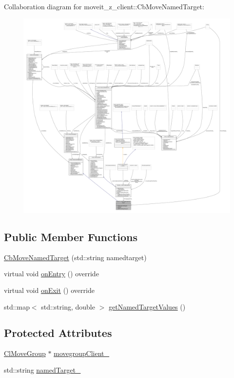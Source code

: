 Collaboration diagram for moveit\+\_\+z\+\_\+client\+:\+:Cb\+Move\+Named\+Target\+:
\nopagebreak
\begin{figure}[H]
\begin{center}
\leavevmode
\includegraphics[width=350pt]{classmoveit__z__client_1_1CbMoveNamedTarget__coll__graph}
\end{center}
\end{figure}
\subsection*{Public Member Functions}
\begin{DoxyCompactItemize}
\item 
\hyperlink{classmoveit__z__client_1_1CbMoveNamedTarget_a4cd1851e18426af84f5b77724d422d4c}{Cb\+Move\+Named\+Target} (std\+::string namedtarget)
\item 
virtual void \hyperlink{classmoveit__z__client_1_1CbMoveNamedTarget_ad84bcf4ea514c0cdc3550ca41ff77d69}{on\+Entry} () override
\item 
virtual void \hyperlink{classmoveit__z__client_1_1CbMoveNamedTarget_ab91985b232e1185b4b102bb309f65ffc}{on\+Exit} () override
\item 
std\+::map$<$ std\+::string, double $>$ \hyperlink{classmoveit__z__client_1_1CbMoveNamedTarget_aa6efe35fc4ef43e8f1b4e762de70c3bf}{get\+Named\+Target\+Values} ()
\end{DoxyCompactItemize}
\subsection*{Protected Attributes}
\begin{DoxyCompactItemize}
\item 
\hyperlink{classmoveit__z__client_1_1ClMoveGroup}{Cl\+Move\+Group} $\ast$ \hyperlink{classmoveit__z__client_1_1CbMoveNamedTarget_a1caf87b542890eb9181b04dc2271ef65}{movegroup\+Client\+\_\+}
\item 
std\+::string \hyperlink{classmoveit__z__client_1_1CbMoveNamedTarget_a84a8aadc460b4a68eae22d25479c2bce}{named\+Target\+\_\+}
\end{DoxyCompactItemize}


